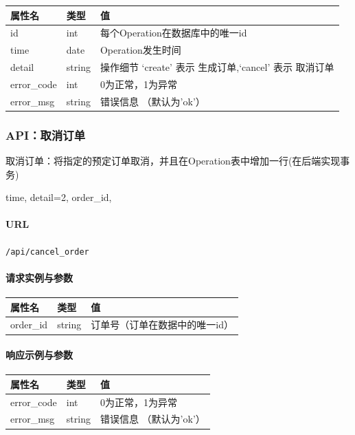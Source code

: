 \documentclass[]{article}
\let\oldparagraph\paragraph
\renewcommand{\paragraph}[1]{\oldparagraph{#1}\mbox{}}
\begin{document}
\begin{longtable}[]{@{}lll@{}}
\toprule
属性名 & 类型 & 值\tabularnewline
\midrule
\endhead
id & int & 每个Operation在数据库中的唯一id\tabularnewline
time & date & Operation发生时间\tabularnewline
detail & string & 操作细节 `create' 表示 生成订单,`cancel' 表示
取消订单\tabularnewline
error\_code & int & 0为正常，1为异常\tabularnewline
error\_msg & string & 错误信息 （默认为'ok'）\tabularnewline
\bottomrule
\end{longtable}

\hypertarget{apiux53d6ux6d88ux8ba2ux5355}{%
\subsubsection{API：取消订单}\label{apiux53d6ux6d88ux8ba2ux5355}}

取消订单：将指定的预定订单取消，并且在Operation表中增加一行(在后端实现事务)

time, detail=2, order\_id,

\hypertarget{url-20}{%
\paragraph{URL}\label{url-20}}

\texttt{/api/cancel\_order}

\hypertarget{ux8bf7ux6c42ux5b9eux4f8bux4e0eux53c2ux6570-4}{%
\paragraph{请求实例与参数}\label{ux8bf7ux6c42ux5b9eux4f8bux4e0eux53c2ux6570-4}}

\begin{longtable}[]{@{}lll@{}}
\toprule
属性名 & 类型 & 值\tabularnewline
\midrule
\endhead
order\_id & string & 订单号（订单在数据中的唯一id）\tabularnewline
\bottomrule
\end{longtable}

\hypertarget{ux54cdux5e94ux793aux4f8bux4e0eux53c2ux6570-14}{%
\paragraph{响应示例与参数}\label{ux54cdux5e94ux793aux4f8bux4e0eux53c2ux6570-14}}

\begin{longtable}[]{@{}lll@{}}
\toprule
属性名 & 类型 & 值\tabularnewline
\midrule
\endhead
error\_code & int & 0为正常，1为异常\tabularnewline
error\_msg & string & 错误信息 （默认为'ok'）\tabularnewline
\bottomrule
\end{longtable}
\end{document}
